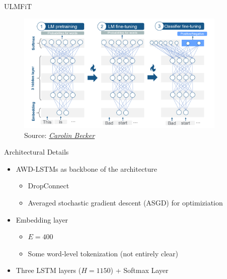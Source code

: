 
\begin{vbframe}{ULMFiT \href{https://www.aclweb.org/anthology/P18-1031.pdf}{}}

\vfill

	\begin{figure}
		\centering
		\includegraphics[width = 10cm]{figure/ulmfit-overview-new}\\ 
		\footnotesize{Source:} \href{https://slds-lmu.github.io/seminar_nlp_ss20/transfer-learning-for-nlp-i.html}{\footnotesize \it Carolin Becker}
	\end{figure}

\vfill

\end{vbframe}


\begin{vbframe}{Architectural Details}

\vfill

\begin{itemize}
	\item AWD-LSTMs \href{https://arxiv.org/pdf/1708.02182.pdf}{} as backbone of the architecture
		\begin{itemize}
			\item DropConnect \href{http://proceedings.mlr.press/v28/wan13.pdf}{}
			\item Averaged stochastic gradient descent (ASGD) for optimiziation
		\end{itemize}
	\item Embedding layer 
		\begin{itemize}
			\item $E = 400$
			\item Some word-level tokenization (not entirely clear) 
		\end{itemize}
	\item Three LSTM layers ($H = 1150$) + Softmax Layer
\end{itemize}

\vfill

\end{vbframe}

